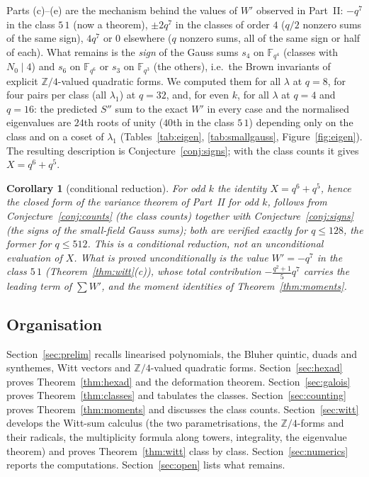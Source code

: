 \documentclass[12pt,a4paper]{amsart}
\newtheorem{corollary}[theorem]{Corollary}
\theoremstyle{definition}
\newcommand{\F}{\mathbb{F}}
\newcommand{\Z}{\mathbb{Z}}
\newcommand{\Spp}{S''}
\begin{document}
Parts (c)--(e) are the mechanism behind the values of $W'$ observed in Part~II: $-q^7$ in the class $5\,1$ (now a theorem), $\pm2q^7$ in the classes of order $4$ ($q/2$ nonzero sums of the same sign), $4q^7$ or $0$ elsewhere ($q$ nonzero sums, all of the same sign or half of each). What remains is the \emph{sign} of the Gauss sums $s_4$ on $\F_{q^4}$ (classes with $N_0\mid4$) and $s_6$ on $\F_{q^6}$ or $s_3$ on $\F_{q^3}$ (the others), i.e.\ the Brown invariants of explicit $\Z/4$-valued quadratic forms. We computed them for all $\lambda$ at $q=8$, for four pairs per class (all $\lambda_1$) at $q=32$, and, for even $k$, for all $\lambda$ at $q=4$ and $q=16$: the predicted $\Spp$ sum to the exact $W'$ in every case and the normalised eigenvalues are $24$th roots of unity ($40$th in the class $5\,1$) depending only on the class and on a coset of $\lambda_1$ (Tables~\ref{tab:eigen}, \ref{tab:smallgauss}, Figure~\ref{fig:eigen}). The resulting description is Conjecture~\ref{conj:signs}; with the class counts it gives $X=q^6+q^5$.

\begin{corollary}[conditional reduction]\label{cor:X}
For odd $k$ the identity $X=q^6+q^5$, hence the closed form of the variance theorem of Part~II for odd $k$, follows from Conjecture~\ref{conj:counts} (the class counts) together with Conjecture~\ref{conj:signs} (the signs of the small-field Gauss sums); both are verified exactly for $q\le128$, the former for $q\le512$. This is a conditional reduction, not an unconditional evaluation of $X$. What is proved unconditionally is the value $W'=-q^7$ in the class $5\,1$ (Theorem~\ref{thm:witt}(c)), whose total contribution $-\frac{q^2+1}{5}q^7$ carries the leading term of $\sum W'$, and the moment identities of Theorem~\ref{thm:moments}.
\end{corollary}

\subsection{Organisation}
Section~\ref{sec:prelim} recalls linearised polynomials, the Bluher quintic, duads and synthemes, Witt vectors and $\Z/4$-valued quadratic forms. Section~\ref{sec:hexad} proves Theorem~\ref{thm:hexad} and the deformation theorem. Section~\ref{sec:galois} proves Theorem~\ref{thm:classes} and tabulates the classes. Section~\ref{sec:counting} proves Theorem~\ref{thm:moments} and discusses the class counts. Section~\ref{sec:witt} develops the Witt-sum calculus (the two parametrisations, the $\Z/4$-forms and their radicals, the multiplicity formula along towers, integrality, the eigenvalue theorem) and proves Theorem~\ref{thm:witt} class by class. Section~\ref{sec:numerics} reports the computations. Section~\ref{sec:open} lists what remains.
\end{document}
